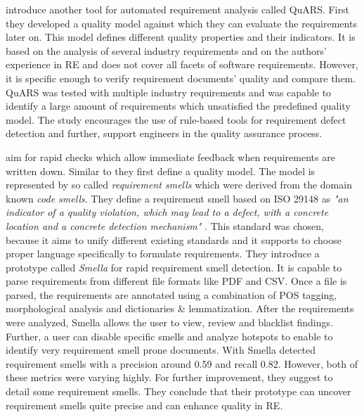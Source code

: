 \textcite{Fabbrini:2002} introduce another tool for automated requirement analysis called \ac{QuARS}.
First they developed a quality model against which they can evaluate the requirements later on.
This model defines different quality properties and their indicators.
It is based on the analysis of several industry requirements and on the authors' experience in \ac{RE} and does not cover all facets of software requirements.
However, it is specific enough to verify requirement documents' quality and compare them.
\Ac{QuARS} was tested with multiple industry requirements and was capable to identify a large amount of requirements which unsatisfied the predefined quality model.
The study encourages the use of rule-based tools for requirement defect detection and further, support engineers in the quality assurance process.

\textcite{Femmer:2017} aim for rapid checks which allow immediate feedback when requirements are written down.
Similar to \textcite{Fabbrini:2002} they first define a quality model.
The model is represented by so called \textit{requirement smells} which were derived from the domain known \textit{code smells}.
They define a requirement smell based on ISO 29148 as \textit{"an indicator of a quality violation, which may lead to a defect, with a concrete location and a concrete detection mechanism"} \parencite{Femmer:2017}.
This standard was chosen, because it aims to unify different existing standards and it supports to choose proper language specifically to formulate requirements.
They introduce a prototype called \textit{Smella} for rapid requirement smell detection.
It is capable to parse requirements from different file formats like \ac{PDF} and \ac{CSV}.
Once a file is parsed, the requirements are annotated using a combination of \ac{POS} tagging, morphological analysis and dictionaries \& lemmatization.
After the requirements were analyzed, Smella allows the user to view, review and blacklist findings.
Further, a user can disable specific smells and analyze hotspots to enable to identify very requirement smell prone documents.
With Smella \textcite{Femmer:2017} detected requirement smells with a precision around 0.59 and recall 0.82.
However, both of these metrics were varying highly.
For further improvement, they suggest to detail some requirement smells.
They conclude that their prototype can uncover requirement smells quite precise and can enhance quality in \ac{RE}.

